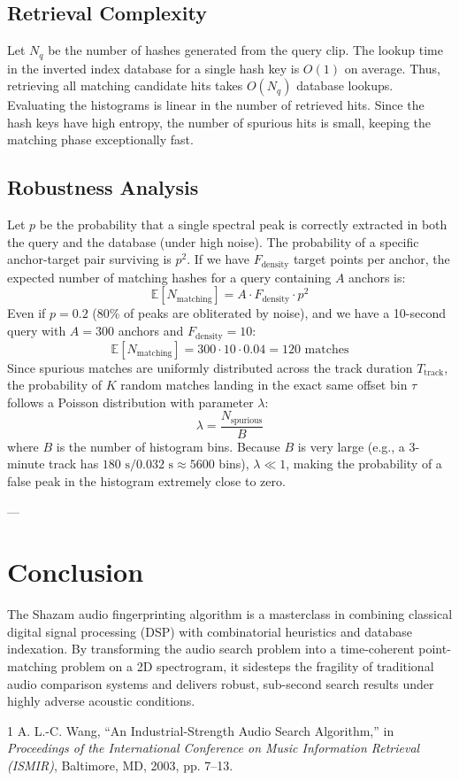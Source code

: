 \documentclass[11pt,journal,onecolumn]{IEEEtran}
\begin{document}
\subsection{Retrieval Complexity}
Let $N_q$ be the number of hashes generated from the query clip. The lookup time in the inverted index database for a single hash key is $O(1)$ on average. Thus, retrieving all matching candidate hits takes $O(N_q)$ database lookups.
Evaluating the histograms is linear in the number of retrieved hits. Since the hash keys have high entropy, the number of spurious hits is small, keeping the matching phase exceptionally fast.

\subsection{Robustness Analysis}
Let $p$ be the probability that a single spectral peak is correctly extracted in both the query and the database (under high noise).
The probability of a specific anchor-target pair surviving is $p^2$.
If we have $F_{\text{density}}$ target points per anchor, the expected number of matching hashes for a query containing $A$ anchors is:
\begin{equation}
\mathbb{E}[N_{\text{matching}}] = A \cdot F_{\text{density}} \cdot p^2
\end{equation}
Even if $p = 0.2$ (80\% of peaks are obliterated by noise), and we have a 10-second query with $A = 300$ anchors and $F_{\text{density}} = 10$:
\begin{equation}
\mathbb{E}[N_{\text{matching}}] = 300 \cdot 10 \cdot 0.04 = 120 \text{ matches}
\end{equation}
Since spurious matches are uniformly distributed across the track duration $T_{\text{track}}$, the probability of $K$ random matches landing in the exact same offset bin $\tau$ follows a Poisson distribution with parameter $\lambda$:
\begin{equation}
\lambda = \frac{N_{\text{spurious}}}{B}
\end{equation}
where $B$ is the number of histogram bins. Because $B$ is very large (e.g., a 3-minute track has $180 \text{ s} / 0.032 \text{ s} \approx 5600$ bins), $\lambda \ll 1$, making the probability of a false peak in the histogram extremely close to zero.

---

\section{Conclusion}
The Shazam audio fingerprinting algorithm is a masterclass in combining classical digital signal processing (DSP) with combinatorial heuristics and database indexation. By transforming the audio search problem into a time-coherent point-matching problem on a 2D spectrogram, it sidesteps the fragility of traditional audio comparison systems and delivers robust, sub-second search results under highly adverse acoustic conditions.

\begin{thebibliography}{1}
A. L.-C. Wang, ``An Industrial-Strength Audio Search Algorithm,'' in \textit{Proceedings of the International Conference on Music Information Retrieval (ISMIR)}, Baltimore, MD, 2003, pp. 7--13.
\end{thebibliography}
\end{document}
